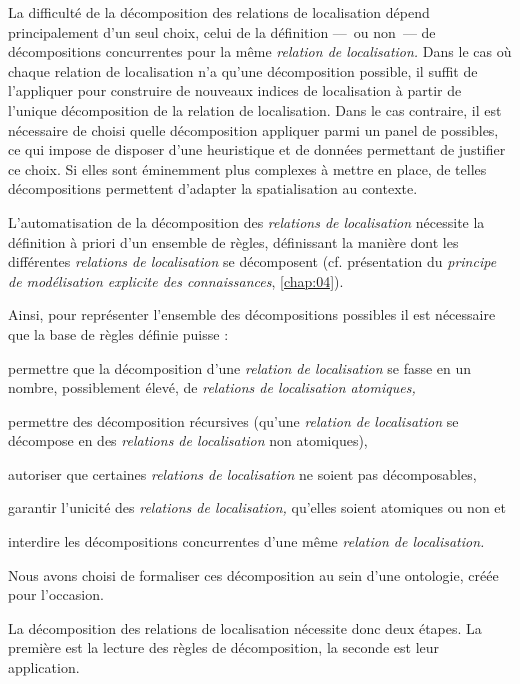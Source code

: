 La difficulté de la décomposition des relations de localisation dépend
principalement d'un seul choix, celui de la définition ---~ou non~---
de décompositions concurrentes pour la même \emph{relation de
  localisation.} Dans le cas où chaque relation de localisation n'a
qu'une décomposition possible, il suffit de l'appliquer pour
construire de nouveaux indices de localisation à partir de l'unique
décomposition de la relation de localisation. Dans le cas contraire,
il est nécessaire de choisi quelle décomposition appliquer parmi un
panel de possibles, ce qui impose de disposer d'une heuristique et de
données permettant de justifier ce choix. Si elles sont éminemment
plus complexes à mettre en place, de telles décompositions permettent
d’adapter la spatialisation au contexte.


L'automatisation de la décomposition des \emph{relations de
  localisation} nécessite la définition à priori d'un ensemble de
règles, définissant la manière dont les différentes \emph{relations de
  localisation} se décomposent (cf. présentation du \emph{principe de
  modélisation explicite des connaissances}, \autoref{chap:04}). 

Ainsi, pour représenter l'ensemble des décompositions possibles il est
nécessaire que la base de règles définie puisse :
\begin{enumerate*}[label=(\arabic*)]
\item permettre que la décomposition d'une \emph{relation de
    localisation} se fasse en un nombre, possiblement élevé, de
  \emph{relations de localisation atomiques,}
\item permettre des décomposition récursives (\ie qu'une
  \emph{relation de localisation} se décompose en des \emph{relations
    de localisation} non atomiques),
\item autoriser que certaines \emph{relations de localisation} ne soient pas
  décomposables,
\item garantir l'unicité des \emph{relations de localisation,}
  qu'elles soient atomiques ou non et
\item interdire les décompositions concurrentes d'une même
  \emph{relation de localisation.}
\end{enumerate*}


Nous avons choisi de formaliser ces décomposition
au sein d'une ontologie, créée pour l'occasion.

La décomposition des relations de localisation nécessite donc deux
étapes. La première est la lecture des règles de décomposition, la
seconde est leur application.


